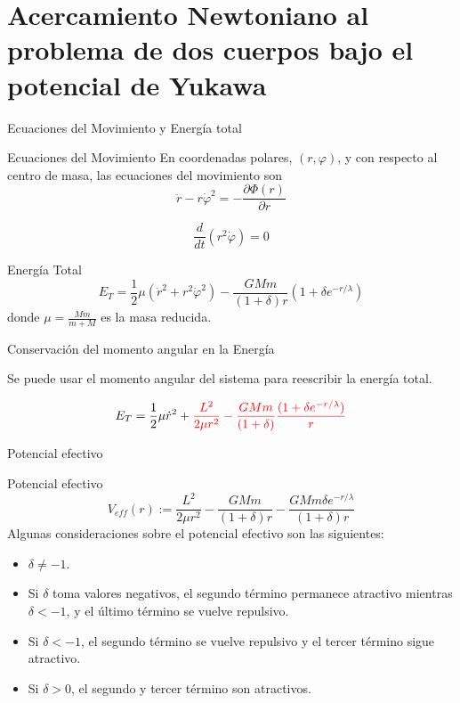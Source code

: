 \documentclass{beamer}
\begin{document}
	\section{Acercamiento Newtoniano al problema de dos cuerpos bajo el potencial de Yukawa}
	\begin{frame}{Ecuaciones del Movimiento y Energía total}
	\begin{block}{Ecuaciones del Movimiento}
	En coordenadas polares, $(r, \varphi)$, y con respecto al centro de masa, las ecuaciones del movimiento son
		\begin{equation}
		\ddot{r}-r\dot{\varphi}^2=-\frac{\partial \Phi(r)}{\partial r}
		\end{equation}
	
		\begin{equation}
		\frac{d}{dt}(r^2 \dot{\varphi})=0
		\end{equation}
	\end{block}
	
	\begin{block}{Energía Total}
		\begin{equation}
			E_T=\frac{1}{2}\mu(\dot{r}^2+r^2\dot{\varphi}^2)-\frac{GMm}{(1+\delta)r}(1+\delta e^{-r/\lambda})
		\end{equation}
		donde $\mu=\frac{Mm}{m+M}$ es la masa reducida.
	\end{block}
	\end{frame}
	
	\begin{frame}{Conservación del momento angular en la Energía}
	
	Se puede usar el momento angular del sistema para reescribir la energía total.
	
	$$E_T=\frac{1}{2}\mu\dot{r}^2+\textcolor{red}{\frac{L^2}{2\mu r^2}-\frac{GMm}{(1+\delta)}\frac{(1+\delta e^{-r/\lambda})}{r}}$$	
	
	\end{frame}
	
	\begin{frame}{Potencial efectivo}
	\begin{block}{Potencial efectivo}
		\begin{equation}
			V_{eff}(r):=\frac{L^2}{2\mu r^2}-\frac{GMm}{(1+\delta)r}-\frac{GMm\delta e^{-r/\lambda}}{(1+\delta)r}
		\end{equation}
		Algunas consideraciones sobre el potencial efectivo son las siguientes:
		\begin{itemize}
			\item $\delta\neq -1.$
			\item Si $\delta$ toma valores negativos, el segundo término permanece atractivo mientras $\delta<-1$, y el último término se vuelve repulsivo.
			\item Si $\delta<-1$, el segundo término se vuelve repulsivo y el tercer término sigue atractivo.
			\item Si $\delta>0$, el segundo y tercer término son atractivos.
		\end{itemize}
	\end{block}
	\end{frame}
	
\end{document}
